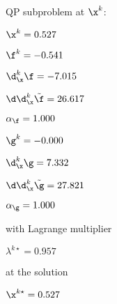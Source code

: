 QP subproblem at $\x^{k}$:

\bigskip
$\x^k=   0.527$


$\f^k =  -0.541$

$\d^k_{\x} \f =  -7.015$

$\d\d^k_{\x} \tilde \f =  26.617$

$\alpha_{\footnotesize\f} =   1.000$

\bigskip
$\g^k =  -0.000$

$\d^k_{\x}\g =   7.332$

$\d\d^k_{\x} \tilde \g =  27.821$

$\alpha_{\footnotesize\g} =   1.000$

\bigskip
with Lagrange multiplier

$\lambda^{k\star} =   0.957$

at the solution

$\x^{k\star} =   0.527$

